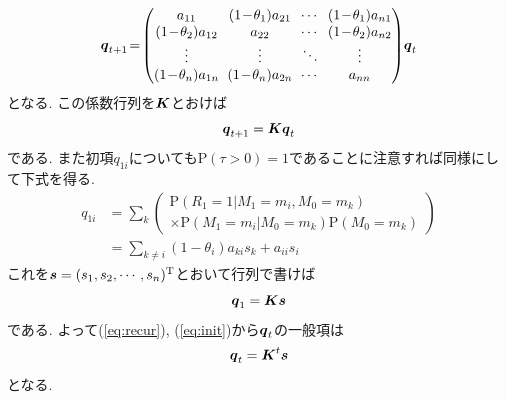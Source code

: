 \begin{equation*}
    \arraycolsep3pt
    \V{q}_{t + 1} \! = \!
    \begin{pmatrix}
        a_{1 1} & (1 \! - \! \theta_1) a_{2 1} & \cdots & (1 \! - \! \theta_1) a_{n 1} \\
        (1 \! - \! \theta_2) a_{1 2} & a_{2 2} & \cdots & (1 \! - \! \theta_2) a_{n 2} \\
        \vdots & \vdots & \ddots & \vdots \\
        (1 \! - \! \theta_n) a_{1 n} & (1 \! - \! \theta_n) a_{2 n} & \cdots & a_{n n} \\
    \end{pmatrix}
    \! \V{q}_t
\end{equation*}
となる. この係数行列を$ \boldsymbol{K} $とおけば
\begin{equation} \label{eq:recur}
    \boldsymbol{q}_{t + 1} = \boldsymbol{K} \boldsymbol{q}_t
\end{equation}
である. また初項$ q_{1 i} $についても$ \mathrm{P}(\tau > 0) = 1 $であることに注意すれば同様にして下式を得る. 
\begin{align*}
    q_{1 i} & = \! \sum_{k} \left(
        \begin{array}{l}
            \mathrm{P}(R_1 = 1 | M_1 = m_i , M_0 = m_k) \\
            \times \mathrm{P}(M_1 = m_i | M_0 = m_k) \mathrm{P}(M_0 = m_k)
        \end{array}
    \right) \\
    & = \! \sum_{k \ne i} (1 - \theta_i) a_{k i} s_k + a_{i i} s_i
\end{align*}
これを$ \boldsymbol{s} = (s_1 , s_2 , \cdots , s_n)^\mathrm{T} $とおいて行列で書けば
\begin{equation} \label{eq:init}
    \boldsymbol{q}_1 = \boldsymbol{K} \boldsymbol{s}
\end{equation}
である. よって(\ref{eq:recur}), (\ref{eq:init})から$ \boldsymbol{q}_t $の一般項は
\begin{equation} \label{eq:qt}
    \boldsymbol{q}_t = \boldsymbol{K}^t \boldsymbol{s}
\end{equation}
となる. 

